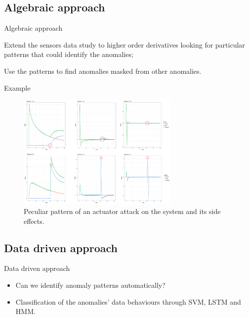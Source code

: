 \documentclass{beamer}
\def\itemizespace{\vspace{7mm}}
\begin{document}
\subsection{Algebraic approach}
\begin{frame}{Algebraic approach}
	\begin{description}[<+->]
		\item[Basic:] Extend the sensors data study to higher order derivatives
			looking for particular patterns that could identify the anomalies;

		\itemizespace%

		\item[Improved:] Use the patterns to find anomalies masked from other
			anomalies.

	\end{description}
\end{frame}
\begin{frame}{Example}
	\begin{figure}
		\centering
		\includegraphics[width=0.7\textwidth]{attack_peak_circled.png}
		\caption{Peculiar pattern of an actuator attack on the system and its
		side effects.}
	\end{figure}
\end{frame}

\subsection{Data driven approach}
\begin{frame}{Data driven approach}
	\begin{itemize}[<+->]
		\item[] Can we identify anomaly patterns automatically?

		\itemizespace%

		\item[] Classification of the anomalies' data behaviours through SVM,
			LSTM and HMM.
	\end{itemize}
\end{frame}
\end{document}
